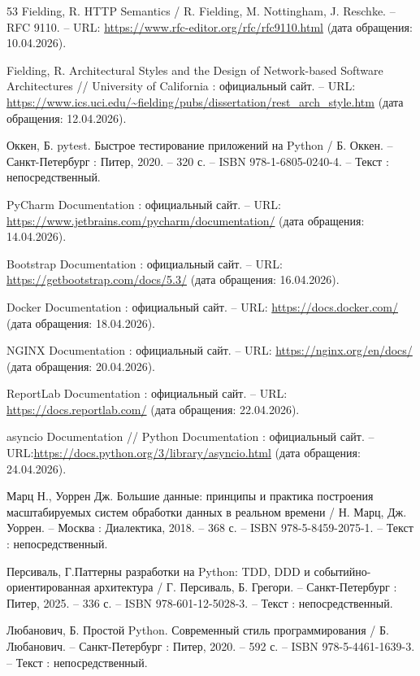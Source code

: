 \begin{thebibliography}{53}
	Fielding, R. HTTP Semantics / R. Fielding, M. Nottingham, J. Reschke. – RFC 9110. – URL: \url{https://www.rfc-editor.org/rfc/rfc9110.html} (дата обращения: 10.04.2026).
	
	Fielding, R. Architectural Styles and the Design of Network-based Software Architectures // University of California : официальный сайт. – URL: \url{https://www.ics.uci.edu/~fielding/pubs/dissertation/rest_arch_style.htm} (дата обращения: 12.04.2026).
	
	Оккен, Б. pytest. Быстрое тестирование приложений на Python / Б. Оккен. – Санкт-Петербург : Питер, 2020. – 320 с. – ISBN  978-1-6805-0240-4. – Текст : непосредственный.
	
	PyCharm Documentation : официальный сайт. – URL: \url{https://www.jetbrains.com/pycharm/documentation/} (дата обращения: 14.04.2026).
	
	Bootstrap Documentation : официальный сайт. – URL: \url{https://getbootstrap.com/docs/5.3/} (дата обращения: 16.04.2026).
	
	Docker Documentation : официальный сайт. – URL: \url{https://docs.docker.com/} (дата обращения: 18.04.2026).
	
	NGINX Documentation : официальный сайт. – URL: \url{https://nginx.org/en/docs/} (дата обращения: 20.04.2026).
	
	ReportLab Documentation : официальный сайт. – URL: \url{https://docs.reportlab.com/} (дата обращения: 22.04.2026).
	
	asyncio Documentation // Python Documentation : официальный сайт. – URL:\url{https://docs.python.org/3/library/asyncio.html} (дата обращения: 24.04.2026).
	
	Марц Н., Уоррен Дж. Большие данные: принципы и практика построения масштабируемых систем обработки данных в реальном времени / Н. Марц, Дж. Уоррен. – Москва : Диалектика, 2018. – 368 с. – ISBN 978-5-8459-2075-1. – Текст : непосредственный.
	
	Персиваль, Г.Паттерны разработки на Python: TDD, DDD и событийно-ориентированная архитектура / Г. Персиваль, Б. Грегори. – Санкт-Петербург : Питер, 2025. – 336 с. – ISBN 978-601-12-5028-3. – Текст : непосредственный.
	
	Любанович, Б. Простой Python. Современный стиль программирования / Б. Любанович. – Санкт-Петербург : Питер, 2020. – 592 с. – ISBN 978-5-4461-1639-3. – Текст : непосредственный.
	

\end{thebibliography}
